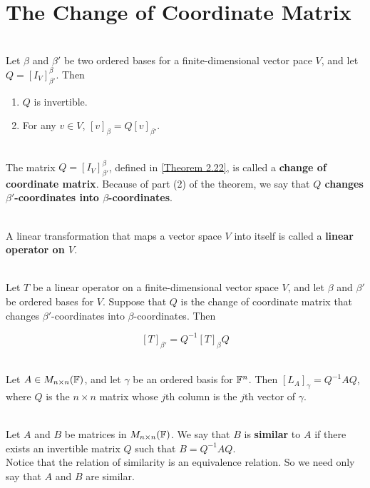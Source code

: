 \section{The Change of Coordinate Matrix}

\begin{theorem}\label{Theorem 2.22}
	\hfill\\
	Let $\beta$ and $\beta'$ be two ordered bases for a finite-dimensional vector pace $V$, and let $Q = [I_V]_{\beta'}^\beta$. Then
	
	\begin{enumerate}
		\item $Q$ is invertible.
		\item For any $v \in V$, $[v]_\beta = Q[v]_{\beta'}$.
	\end{enumerate}
\end{theorem}

\begin{definition}
	\hfill\\
	The matrix $Q=[I_V]_{\beta'}^\beta$, defined in \autoref{Theorem 2.22}, is called a \textbf{change of coordinate matrix}. Because of part (2) of the theorem, we say that \textbf{$Q$ changes $\beta'$-coordinates into $\beta$-coordinates}.
\end{definition}

\begin{definition}
	\hfill\\
	A linear transformation that maps a vector space $V$ into itself is called a \textbf{linear operator on $V$}.
\end{definition}

\begin{theorem}
	\hfill\\
	Let $T$ be a linear operator on a finite-dimensional vector space $V$, and let $\beta$ and $\beta'$ be ordered bases for $V$. Suppose that $Q$ is the change of coordinate matrix that changes $\beta'$-coordinates into $\beta$-coordinates. Then
	
	\[[T]_{\beta'}=Q^{-1}[T]_\beta Q\]
\end{theorem}

\begin{corollary}
	\hfill\\
	Let $A \in M_{n \times n}(\mathbb{F})$, and let $\gamma$ be an ordered basis for $\mathbb{F}^n$. Then $[L_A]_\gamma = Q^{-1}AQ$, where $Q$ is the $n \times n$ matrix whose $j$th column is the $j$th vector of $\gamma$.
\end{corollary}

\begin{definition}
	\hfill\\
	Let $A$ and $B$ be matrices in $M_{n \times n}(\mathbb{F})$. We say that $B$ is \textbf{similar} to $A$ if there exists an invertible matrix $Q$ such that $B = Q^{-1}AQ$.\\
	
	Notice that the relation of similarity is an equivalence relation. So we need only say that $A$ and $B$ are similar.
\end{definition}